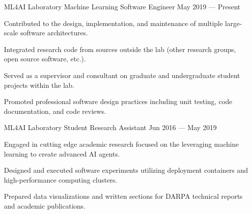 
\vspace{-0.2cm}
\begin{cventries}

  \cventry
    {ML4AI Laboratory} %
    {Machine Learning Software Engineer} %
    {May 2019 --- Present} %
    {} %
    {
      \begin{cvitems} %
        \item Contributed to the design, implementation, and maintenance of multiple large-scale software architectures.
        \item Integrated research code from sources outside the lab (other research groups, open source software, etc.).
        \item Served as a supervisor and consultant on graduate and undergraduate student projects within the lab.
        \item Promoted professional software design practices including unit testing, code documentation, and code reviews.
      \end{cvitems}
    }

  \cventry
    {ML4AI Laboratory} %
    {Student Research Assistant} %
    {Jun 2016 --- May 2019} %
    {} %
    {
      \begin{cvitems} %
        \item Engaged in cutting edge academic research focused on the leveraging machine learning to create advanced AI agents.
        \item Designed and executed software experiments utilizing deployment containers and high-performance computing clusters.
        \item Prepared data visualizations and written sections for DARPA technical reports and academic publications.
        \item <insert new text here>
      \end{cvitems}
    }


\end{cventries}
